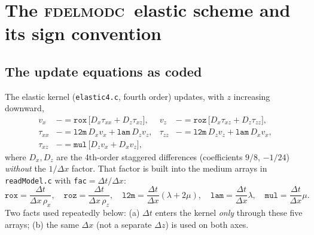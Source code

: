 \documentclass[11pt,a4paper]{article}
\newcommand{\fd}{\textsc{fdelmodc}}
\begin{document}
\section{The \fd\ elastic scheme and its sign convention}
\subsection{The update equations as coded}
The elastic kernel (\texttt{elastic4.c}, fourth order) updates, with $z$
increasing downward,
\begin{align*}
v_x &\mathrel{-}= \texttt{rox}\,\big[D_x\tau_{xx}+D_z\tau_{xz}\big], &
v_z &\mathrel{-}= \texttt{roz}\,\big[D_x\tau_{xz}+D_z\tau_{zz}\big],\\
\tau_{xx}&\mathrel{-}= \texttt{l2m}\,D_xv_x+\texttt{lam}\,D_zv_z, &
\tau_{zz}&\mathrel{-}= \texttt{l2m}\,D_zv_z+\texttt{lam}\,D_xv_x,\\
\tau_{xz}&\mathrel{-}= \texttt{mul}\,\big[D_zv_x+D_xv_z\big],
\end{align*}
where $D_x,D_z$ are the 4th-order staggered differences (coefficients $9/8$, $-1/24$)
\emph{without} the $1/\Delta x$ factor. That factor is built into the medium arrays
in \texttt{readModel.c} with \texttt{fac}$=\Delta t/\Delta x$:
\begin{equation}
\texttt{rox}=\frac{\Delta t}{\Delta x\,\rho_x},\quad
\texttt{roz}=\frac{\Delta t}{\Delta x\,\rho_z},\quad
\texttt{l2m}=\frac{\Delta t}{\Delta x}(\lambda+2\mu),\quad
\texttt{lam}=\frac{\Delta t}{\Delta x}\lambda,\quad
\texttt{mul}=\frac{\Delta t}{\Delta x}\mu .
\label{eq:coefs}
\end{equation}
Two facts used repeatedly below: (a) $\Delta t$ enters the kernel \emph{only}
through these five arrays; (b) the same $\Delta x$ (not a separate $\Delta z$) is
used on both axes.
\end{document}
